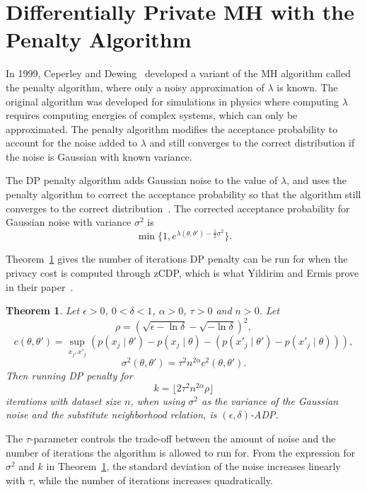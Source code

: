 \documentclass[english,twoside,openright]{HYgraduMLDS}
\newtheorem{theorem}[lemma]{Theorem}
\begin{document}
\section{Differentially Private MH with the Penalty Algorithm}\label{dp_penalty_section}

In 1999, Ceperley and Dewing~\cite{CeD99} developed a variant of 
the MH algorithm called the penalty
algorithm, where only a noisy approximation of \(\lambda\) is known. The
original algorithm was
developed for simulations in physics where computing \(\lambda\)
requires computing energies of complex systems, which can only be approximated.
The penalty algorithm modifies the acceptance probability to account for the 
noise added to \(\lambda\) and still converges to the correct distribution if 
the noise is Gaussian with known variance.

The DP penalty algorithm adds Gaussian noise to the value of \(\lambda\), and 
uses the penalty algorithm to correct the acceptance probability so that 
the algorithm still converges to the correct distribution~\cite{YildirimE19}.
The corrected acceptance probability for Gaussian noise with variance 
\(\sigma^2\) is 
\[
    \min\{1, e^{\lambda(\theta, \theta') - \frac{1}{2}\sigma^2}\}.
\]

Theorem~\ref{DP_penalty_theorem_zcdp} gives the number of iterations DP penalty 
can be run for when the privacy cost is computed through zCDP, which is 
what Yildirim and Ermis prove in their paper~\cite{YildirimE19}.

\begin{theorem}\label{DP_penalty_theorem_zcdp}
  Let \(\epsilon > 0\), \(0 < \delta < 1\), \(\alpha > 0\), \(\tau > 0\) and
  \(n > 0\).
    Let
    \[
        \rho = (\sqrt{\epsilon - \ln \delta} - \sqrt{-\ln \delta})^2,
    \]
    \[
        c(\theta, \theta') = \sup_{x_j, x'_j} (p(x_j\mid \theta') - p(x_j\mid \theta) 
        - (p(x'_j\mid \theta') - p(x'_j\mid \theta))),
    \]
    \[
        \sigma^2(\theta, \theta') = \tau^2 n^{2\alpha}c^2(\theta, \theta').
    \]
    Then running DP penalty for
    \[
        k = \lfloor 2\tau^2 n^{2\alpha} \rho\rfloor
    \]
    iterations with dataset size \(n\), when using \(\sigma^2\) as the
    variance of the Gaussian noise
    and the substitute neighborhood relation, is \((\epsilon, \delta)\)-ADP.
\end{theorem}

The \(\tau\)-parameter controls the trade-off between the amount of noise
and the number of iterations the algorithm is allowed to run for. From the
expression for \(\sigma^{2}\) and \(k\) in Theorem~\ref{DP_penalty_theorem_zcdp},
the standard deviation of the noise increases linearly with \(\tau\), while
the number of iterations increases quadratically.
\end{document}
